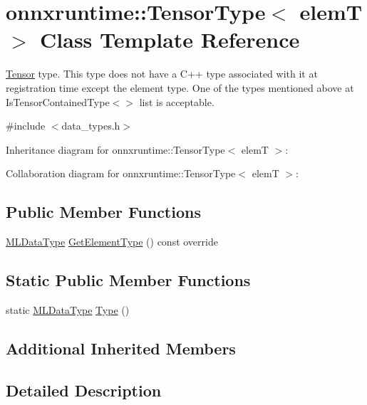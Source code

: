 \hypertarget{classonnxruntime_1_1TensorType}{}\section{onnxruntime\+:\+:Tensor\+Type$<$ elemT $>$ Class Template Reference}
\label{classonnxruntime_1_1TensorType}


\mbox{\hyperlink{classonnxruntime_1_1Tensor}{Tensor}} type. This type does not have a C++ type associated with it at registration time except the element type. One of the types mentioned above at Is\+Tensor\+Contained\+Type$<$$>$ list is acceptable.  




{\ttfamily \#include $<$data\+\_\+types.\+h$>$}



Inheritance diagram for onnxruntime\+:\+:Tensor\+Type$<$ elemT $>$\+:


Collaboration diagram for onnxruntime\+:\+:Tensor\+Type$<$ elemT $>$\+:
\subsection*{Public Member Functions}
\begin{DoxyCompactItemize}
\item 
\mbox{\hyperlink{namespaceonnxruntime_ad77d0a6e838ec7da5dc35fed5ee66b49}{M\+L\+Data\+Type}} \mbox{\hyperlink{classonnxruntime_1_1TensorType_a63ac5e9ac296db98f04899fde5c2221e}{Get\+Element\+Type}} () const override
\end{DoxyCompactItemize}
\subsection*{Static Public Member Functions}
\begin{DoxyCompactItemize}
\item 
static \mbox{\hyperlink{namespaceonnxruntime_ad77d0a6e838ec7da5dc35fed5ee66b49}{M\+L\+Data\+Type}} \mbox{\hyperlink{classonnxruntime_1_1TensorType_a4c00722e54c14583892b2aa75e4568ce}{Type}} ()
\end{DoxyCompactItemize}
\subsection*{Additional Inherited Members}


\subsection{Detailed Description}
